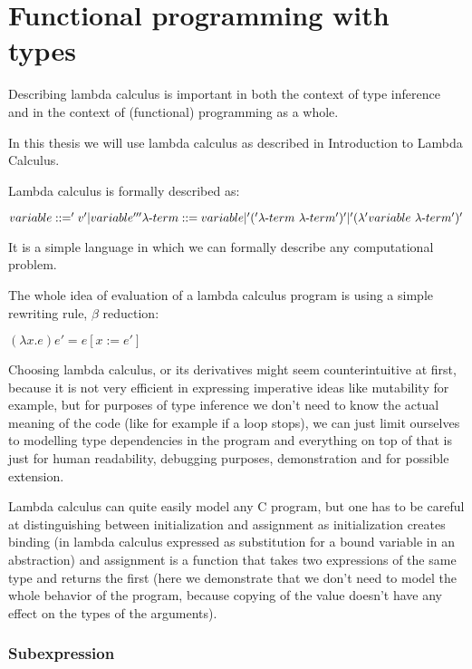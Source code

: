 \chapter{Functional programming with types}

Describing lambda calculus is important in both the context of type inference and in the context of (functional)
programming as a whole.

In this thesis we will use lambda calculus as described in Introduction to Lambda Calculus.  %

Lambda calculus is formally described as:

$variable ::= 'v' | variable ''' \\ \lambda\mbox{-}term ::= variable | '(' \lambda\mbox{-}term\ \lambda\mbox{-}term ')' |  '(\lambda' variable\ \lambda\mbox{-}term ')'$

It is a simple language in which we can formally describe any computational problem.

The whole idea of evaluation of a lambda calculus program is using a simple rewriting rule, $\beta$ reduction:

$(\lambda x . e) e' = e [x := e']$ %

Choosing lambda calculus, or its derivatives might seem counterintuitive at first, because it is not very efficient in expressing imperative ideas like mutability for example, but for purposes of type inference we don't need to know the actual meaning of the code (like for example if a loop stops), we can just limit ourselves to modelling type dependencies in the program and everything on top of that is just for human readability, debugging purposes, demonstration and for possible extension.

Lambda calculus can quite easily model any C program, but one has to be careful at distinguishing between initialization and assignment as initialization creates binding (in lambda calculus expressed as substitution for a bound variable in an abstraction) and assignment is a function that takes two expressions of the same type and returns the first (here we demonstrate that we don't need to model the whole behavior of the program, because copying of the value doesn't have any effect on the types of the arguments).


\subsection{Subexpression}

